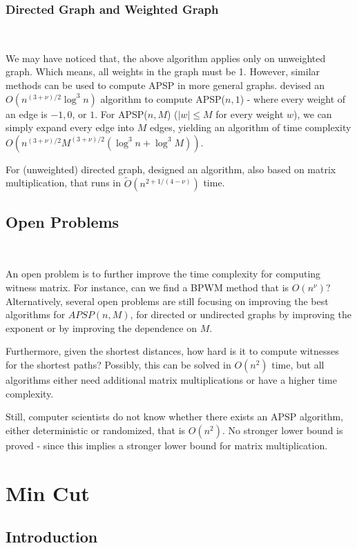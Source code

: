 \documentclass[11pt]{article}
\theoremstyle{plain}
\begin{document}
\subsubsection{Directed Graph and Weighted Graph}\

We may have noticed that, the above algorithm applies only on unweighted graph. Which means, all weights in the graph must be 1. However, similar methods can be used to compute APSP in more general graphs. \cite{ALON1997255} devised an $O(n^{(3+\nu)/2}\log^3 n)$ algorithm to compute APSP($n,1$) - where every weight of an edge is $-1,0$, or $1$. For APSP($n,M$) ($|w|\le M$ for every weight $w$), we can simply expand every edge into $M$ edges, yielding an algorithm of time complexity $O(n^{(3+\nu)/2}M^{(3+\nu)/2}(\log^3 n+\log^3 M)).$

For (unweighted) directed graph, \cite{zwick2000pairsshortestpathsusing} designed an algorithm, also based on matrix multiplication, that runs in $\tilde O(n^{2+1/(4-\nu)})$ time.

\subsection{Open Problems}\

An open problem is to further improve the time complexity for computing witness matrix. For instance, can we find a BPWM method that is $O(n^\nu)$? Alternatively, several open problems are still focusing on improving the best algorithms for $APSP(n, M)$, for directed or undirected graphs by improving the exponent or by improving the dependence on $M$.

Furthermore, given the shortest distances, how hard is it to compute witnesses for the shortest paths? Possibly, this can be solved in $O(n^2)$ time, but all algorithms either need additional matrix multiplications or have a higher time complexity.

Still, computer scientists do not know whether there exists an APSP algorithm, either deterministic or randomized, that is $O(n^2)$. No stronger lower bound is proved - since this implies a stronger lower bound for matrix multiplication.
\section{Min Cut}

\subsection{Introduction}\
\end{document}
